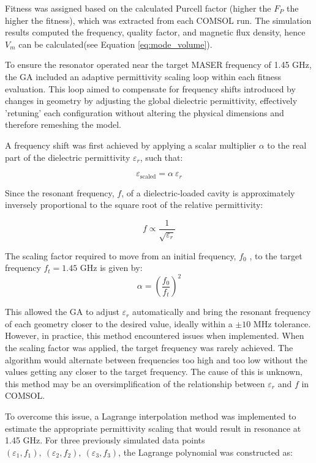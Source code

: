 Fitness was assigned based on the calculated Purcell factor (higher the $F_P$
the higher the fitness), which was extracted from each COMSOL run. The
simulation results computed the frequency, quality factor, and magnetic flux
density, hence $V_m$ can be calculated(see Equation \ref{eq:mode_volume}).

To ensure the resonator operated near the target MASER frequency of 1.45 GHz,
the GA included an adaptive permittivity scaling loop within each fitness
evaluation. This loop aimed to compensate for frequency shifts introduced by
changes in geometry by adjusting the global dielectric permittivity, effectively
'retuning' each configuration without altering the physical dimensions and
therefore remeshing the model.

A frequency shift was first achieved by applying a scalar multiplier $\alpha$ to
the real part of the dielectric permittivity $\varepsilon_r$, such that:

\begin{equation}
  \varepsilon_{\text{scaled}} = \alpha~\varepsilon_r
\end{equation}

Since the resonant frequency, $f$, of a dielectric-loaded cavity is
approximately inversely proportional to the square root of the relative
permittivity:

\begin{equation}
  f \propto \frac{1}{\sqrt{\varepsilon_r}}
\end{equation}

The scaling factor required to move from an initial frequency, $f_0$
, to the target frequency $f_t = 1.45$ GHz is given by:
\begin{equation}
\alpha = \left( \frac{f_0}{f_t} \right)^2
\end{equation}

This allowed the GA to adjust $\varepsilon_r$ automatically and bring the
resonant frequency of each geometry closer to the desired value, ideally within
a $\pm10$ MHz tolerance. However, in practice, this method encountered issues
when implemented. When the scaling factor was applied, the target frequency was
rarely achieved. The algorithm would alternate between frequencies too high and
too low without the values getting any closer to the target frequency. The cause
of this is unknown, this method may be an oversimplification of the relationship
between $\varepsilon_r$ and $f$ in COMSOL.

To overcome this issue, a Lagrange interpolation method was implemented to
estimate the appropriate permittivity scaling that would result in resonance at
1.45 GHz. For three previously simulated data points
$(\varepsilon_1, f_1),\ (\varepsilon_2, f_2),\ (\varepsilon_3, f_3)$, the
Lagrange polynomial was constructed as:

